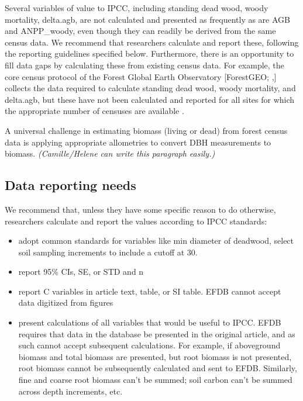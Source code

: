\documentclass[, manuscript]{copernicus}
\begin{document}
Several variables of value to IPCC, including standing dead wood, woody
mortality, delta.agb, are not calculated and presented as frequently as
are AGB and ANPP\_woody, even though they can readily be derived from
the same census data. We recommend that researchers calculate and report
these, following the reporting guidelines specified below. Furthermore,
there is an opportunity to fill data gaps by calculating these from
existing census data. For example, the core census protocol of the
Forest Global Earth Observatory {[}ForestGEO;
\citet{anderson-teixeira_ctfsforestgeo_2015},\citet{davies_forestgeo_2021}{]}
collects the data required to calculate standing dead wood, woody
mortality, and delta.agb, but these have not been calculated and
reported for all sites for which the appropriate number of censuses are
available \citep[but see][\citet{refs}]{piponiot_distribution_2022}.

A universal challenge in estimating biomass (living or dead) from forest
census data is applying appropriate allometries to convert DBH
measurements to biomass. \emph{(Camille/Helene can write this paragraph
easily.)}

\subsection{Data reporting needs}

We recommend that, unless they have some specific reason to do
otherwise, researchers calculate and report the values according to IPCC
standards:

\begin{itemize}
\item
  adopt common standards for variables like min diameter of deadwood,
  select soil sampling increments to include a cutoff at 30.
\item
  report 95\% CIs, SE, or STD and n
\item
  report C variables in article text, table, or SI table. EFDB cannot
  accept data digitized from figures
\item
  present calculations of all variables that would be useful to IPCC.
  EFDB requires that data in the database be presented in the original
  article, and as such cannot accept subsequent calculations. For
  example, if aboveground biomass and total biomass are presented, but
  root biomass is not presented, root biomass cannot be subsequently
  calculated and sent to EFDB. Similarly, fine and coarse root biomass
  can't be summed; soil carbon can't be summed across depth increments,
  etc.
\end{itemize}
\end{document}
